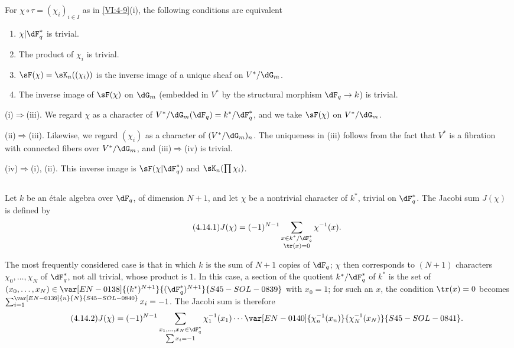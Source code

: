\begin{lemma_}\label{VI:4-13}
For $\chi\circ \tau=(\chi_i)_{i\in I}$ as in \ref{VI:4-9}(i), the
following conditions are equivalent 
\begin{enumerate}[\indent (i)]
  \item $\chi| \dF_q^\ast$ is trivial. 
  \item The product of $\chi_i$ is trivial. 
  \item $\sF(\chi) = \sK_n((\chi_i))$ is the inverse image of a unique 
    sheaf on $V^\ast/\dG_m$. 
  \item The inverse image of $\sF(\chi)$ on $\dG_m$ (embedded in 
    $V^\ast$ by the structural morphism $\dF_q \to k$) is trivial. 
\end{enumerate}
\end{lemma_}

(i)$\Rightarrow$(iii). We regard $\chi$ as a character of 
$V^\ast/\dG_m(\dF_q)=k^\ast/\dF_q^\ast$, and we take $\sF(\chi)$ on 
$V^\ast/\dG_m$. 

(ii)$\Rightarrow$(iii). Likewise, we regard $(\chi_i)$ as a character 
of $(V^\ast/\dG_m)_n$. The uniqueness in (iii) follows from the fact that $V^\ast$ is 
a fibration with connected fibers over $V^\ast/\dG_m$, and (iii)$\Rightarrow$(iv)  
is trivial. 

(iv)$\Rightarrow$(i), (ii). This inverse image is 
$\sF(\chi|\dF_q^\ast)$ and $\sK_n(\prod \chi_i)$. 





\subsection{}\label{VI:4-14}

Let $k$ be an étale algebra over $\dF_q$, of 
dimension $N+1$, and let $\chi$ be a nontrivial character of $k^\ast$, trivial on 
$\dF_q^\ast$. The Jacobi sum $J(\chi)$ is defined by 
\begin{equation*}\tag{4.14.1}\label{VI:eq:4-14-1}
  J(\chi) = (-1)^{N-1} \sum_{\substack{x\in k^\ast/\dF_q^\ast \\ \tr(x)=0}} \chi^{-1}(x) \text{.} 
\end{equation*}

The most frequently considered case is that in which $k$ is the sum of $N+1$
copies of $\dF_q$; $\chi$ then corresponds to $(N+1)$ characters
$\chi_0,\ldots,\chi_N$ of $\dF_q^\ast$, not all trivial, whose product is $1$.
In this case, a section of the quotient $k^\ast/\dF_q^\ast$ of $k^\ast$
is the set of $(x_0,\ldots,x_N)\in\var[EN-0138]{(k^\ast)^{N+1}}{(\dF_q^\ast)^{N+1}}{S45-SOL-0839}$ with $x_0=1$;
for such an $x$, the condition $\tr(x)=0$ becomes $\sum_{i=1}^{\var[EN-0139]{n}{N}{S45-SOL-0840}}x_i=-1$.
The Jacobi sum is therefore
\begin{equation*}\tag{4.14.2}\label{VI:eq:4-14-2}
 J(\chi)=(-1)^{N-1}\sum_{\substack{x_1,\ldots,x_N\in\dF_q^\ast\\\sum x_i=-1}}
 \chi_1^{-1}(x_1)\cdots\var[EN-0140]{\chi_n^{-1}(x_n)}{\chi_N^{-1}(x_N)}{S45-SOL-0841} \text{.}
\end{equation*}

